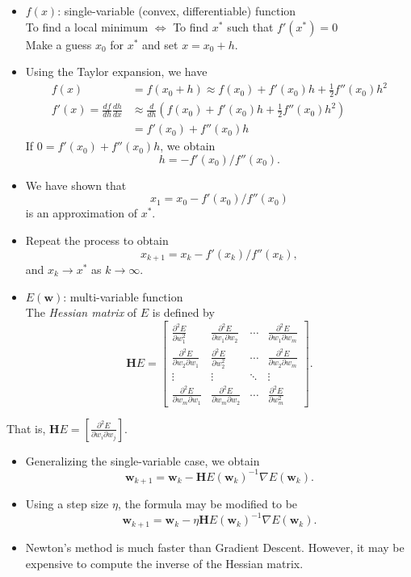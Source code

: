 \documentclass[
]{article}
\begin{document}
\begin{itemize}
\item
  \(f(x)\): single-variable (convex, differentiable) function\\
  To find a local minimum \(\Longleftrightarrow\) \qquad To find \(x^*\)
  such that \(f'(x^*)=0\)\\
  Make a guess \(x_0\) for \(x^*\) and set \(x=x_0+h\).
\item
  Using the Taylor expansion, we have
  \begin{align*} f(x) &=f(x_0+h) \approx f(x_0) + f'(x_0) h+ \tfrac 1 2 f''(x_0) h^2 \\ f'(x) = \frac{df}{dh}\frac {dh}{dx} & \approx \frac d {dh} \left ( f(x_0) + f'(x_0) h+ \tfrac 1 2 f''(x_0) h^2 \right ) \\
  &= f'(x_0) + f''(x_0)h \end{align*} If \(0 = f'(x_0) + f''(x_0)h\), we
  obtain \[ h = - f'(x_0)/f''(x_0). \]
\item
  We have shown that \[ x_1=x_0- f'(x_0)/f''(x_0) \] is an approximation
  of \(x^*\).
\item
  Repeat the process to obtain
  \[ \boxed{x_{k+1}=x_k- f'(x_k)/f''(x_k)},  \] and
  \(x_k \rightarrow x^*\) as \(k \rightarrow \infty\).
\item
  \(E({\boldsymbol{w}})\): multi-variable function\\
  The \emph{Hessian matrix} of \(E\) is defined by
  \[ \mathbf H E= \begin{bmatrix} \tfrac {\partial^2 E}{\partial w_1^2} &  \tfrac {\partial^2 E}{\partial w_1 \partial w_2} & \cdots &  \tfrac {\partial^2 E}{\partial w_1 \partial w_m} \\ \tfrac {\partial^2 E}{\partial w_2 \partial w_1} & \tfrac {\partial^2 E}{\partial w_2^2} & \cdots & \tfrac {\partial^2 E}{\partial w_2 \partial w_m} \\ \vdots & \vdots & \ddots & \vdots \\ \tfrac {\partial^2 E}{\partial w_m \partial w_1} & \tfrac {\partial^2 E}{\partial w_m \partial w_2} & \cdots & \tfrac {\partial^2 E}{\partial w_m^2}  \end{bmatrix}. \]
\end{itemize}

That is,
\(\mathbf H E= [ \tfrac {\partial^2 E}{\partial w_i \partial w_j}]\).

\begin{itemize}
\item
  Generalizing the single-variable case, we obtain\\
  \[ \boxed{ {\boldsymbol{w}}_{k+1}= {\boldsymbol{w}}_k - \mathbf H E ({\boldsymbol{w}}_{k})^{-1} \nabla E({\boldsymbol{w}}_k)} . \]
\item
  Using a step size \(\eta\), the formula may be modified to be
  \[  \boxed{ {\boldsymbol{w}}_{k+1}= {\boldsymbol{w}}_k - \eta \mathbf H E ({\boldsymbol{w}}_{k})^{-1} \nabla E({\boldsymbol{w}}_k)} . \]
\item
  Newton's method is much faster than Gradient Descent. However, it may
  be expensive to compute the inverse of the Hessian matrix.
\end{itemize}
\end{document}
